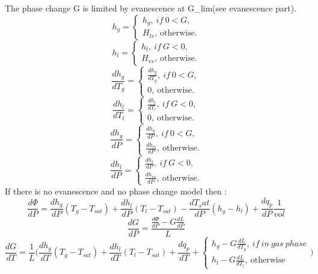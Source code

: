 The phase change G is limited by evanescence at G_{lim}(see evanescence part).
\begin{equation}
    h_g=\begin{cases} h_g,\ if\ 0<G, \\ H_{ls},\ \text{otherwise}.   \end{cases}
\end{equation}
\begin{equation}
    h_l=\begin{cases} h_l,\ if\ G<0, \\ H_{vs},\ \text{otherwise}.   \end{cases}
\end{equation}
\begin{equation}
    \frac{dh_g}{dT_g}=\begin{cases}\frac{dh_g}{dT_g},\ if\ 0<G, \\ 0,\ \text{otherwise}.   \end{cases}
\end{equation}
\begin{equation}
    \frac{dh_l}{dT_l}=\begin{cases}\frac{dh_l}{dT_l},\ if\  G<0, \\ 0,\ \text{otherwise}.   \end{cases}
\end{equation}
\begin{equation}
    \frac{dh_g}{dP}=\begin{cases}\frac{dh_g}{dP},\ if\ 0<G, \\ \frac{dh_{ls}}{dP},\ \text{otherwise}.   \end{cases}
\end{equation}
\begin{equation}
    \frac{dh_l}{dP}=\begin{cases}\frac{dh_l}{dP},\ if\ G<0, \\ \frac{dh_{vs}}{dP},\ \text{otherwise}.   \end{cases}
\end{equation}
If there is no evanescence and no phase change model then : 
\begin{equation}
   \frac{d\Phi}{dP}=\frac{dh_g}{dP}(T_g-T_{sat})+\frac{dh_l}{dP}(T_l-T_{sat})-\frac{dT_sat}{dP}(h_g-h_{l})+\frac{dq_p}{dP}\frac{1}{vol}
\end{equation}
\begin{equation}
   \frac{dG}{dP}=\frac{\frac{d\Phi}{dP}-G\frac{dL}{dP}}{L}
\end{equation}
\begin{equation}
   \frac{dG}{dT}=\frac{1}{L}\Bigg(\frac{dh_g}{dT}(T_g-T_{sat})+\frac{dh_l}{dT}(T_l-T_{sat})+\frac{dq_p}{dT}+\begin{cases}h_g-G\frac{dL}{dT_g},\ if\ in\ gas\ phase \\ h_l-G\frac{dL}{dT_l},\ \text{otherwise} \end{cases}\Bigg)
\end{equation}
